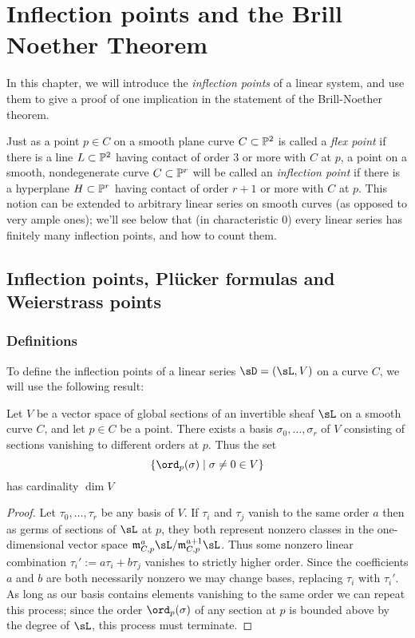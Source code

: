 

\chapter{Inflection points and the Brill Noether Theorem}
\label{InflectionsChapter}


In this chapter, we will introduce the \emph{inflection points} of a linear system, and use them to give a proof of one implication in the statement of the Brill-Noether theorem.

Just as a point $p \in C$ on a smooth plane curve $C \subset \PP^2$ is called a \emph{flex point} if there is a line $L \subset \PP^2$ having contact of order 3 or more with $C$ at $p$, a point on a smooth, nondegenerate curve $C \subset \PP^r$ will be called an \emph{inflection point} if there is a hyperplane $H \subset \PP^r$ having contact of order $r+1$ or more with $C$ at $p$. This notion can be extended to arbitrary linear series on smooth curves (as opposed to very ample ones); we'll see below that (in characteristic 0) every linear series has finitely many inflection points, and how to count them.


\section{Inflection points,  Pl\"ucker formulas and Weierstrass points}

\subsection{Definitions}
To define the inflection points of a linear series $\sD = (\sL, V)$ on a curve $C$, we will use the following result:

\begin{proposition} Let $V$ be a vector space of global sections of an invertible sheaf $\sL$ on a smooth curve $C$, and let $p \in C$ be a point. There exists a basis $\sigma_0, \dots, \sigma_r$ of $V$ consisting of sections vanishing to different orders at $p$. Thus the set
$$
\{ \ord_p(\sigma) \mid \sigma \neq 0 \in V \}
$$
 has cardinality $\dim V$
\end{proposition}

\begin{proof} Let $\tau_0, \dots, \tau_r$ be any basis of $V$. If  $\tau_i$ and $\tau_j$ vanish to the same order $a$ then as germs of sections of $\sL$ at $p$, they both represent nonzero classes in the one-dimensional vector space
$\frak{m}_{C,p}^a\sL/\frak{m}_{C,p}^{a+1}\sL$.  Thus some nonzero linear combination $\tau_i' := a\tau_i+b\tau_j$  vanishes to strictly higher order. Since the coefficients $a$ and $b$ are both necessarily nonzero we may change bases, replacing $\tau_i$ with $\tau_i'$. As long as our basis contains elements vanishing to the same order we can repeat this process; since the order $\ord_p(\sigma)$ of any section at $p$ is bounded above by the degree of $\sL$, this process must terminate.
\end{proof}

